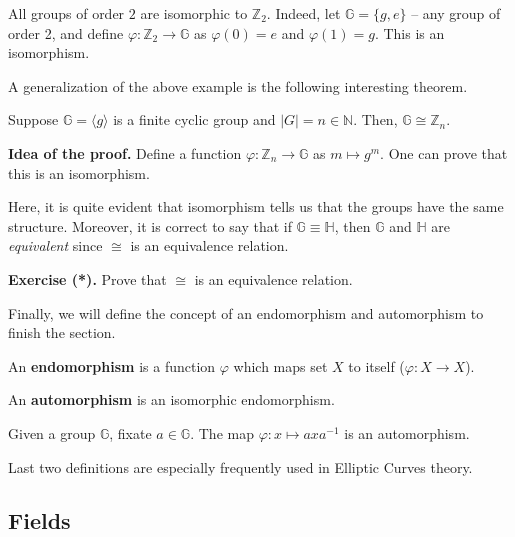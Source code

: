 \documentclass[../lecture-notes-148x210.tex]{subfiles}
\begin{document}
\begin{example}
    All groups of order $2$ are isomorphic to $\mathbb{Z}_2$. Indeed, let $\mathbb{G} = \{g,e\}$ -- any group of order 2, and define $\varphi: \mathbb{Z}_2 \to \mathbb{G}$ as $\varphi(0) = e$ and $\varphi(1) = g$. This is an isomorphism.
\end{example}

A generalization of the above example is the following interesting theorem.

\begin{theorem}
    Suppose $\mathbb{G} = \langle g \rangle$ is a finite cyclic group and $|G| = n \in \mathbb{N}$. Then, $\mathbb{G} \cong \mathbb{Z}_n$.
\end{theorem}

\textbf{Idea of the proof.} Define a function $\varphi: \mathbb{Z}_n \to \mathbb{G}$ as $m \mapsto g^m$. One can prove that this is an isomorphism.

Here, it is quite evident that isomorphism tells us that the groups have the same structure. Moreover, it is correct to say that if $\mathbb{G} \equiv \mathbb{H}$, then $\mathbb{G}$ and $\mathbb{H}$ are \textit{equivalent} since $\cong$ is an equivalence relation.

\textbf{Exercise (*).} Prove that $\cong$ is an equivalence relation.

Finally, we will define the concept of an endomorphism and automorphism to finish the section.

\begin{definition}
    An \textbf{endomorphism} is a function $\varphi$ which maps set $X$ to itself ($\varphi: X \to X$).
\end{definition}

\begin{definition}
    An \textbf{automorphism} is an isomorphic endomorphism.
\end{definition}

\begin{example}
    Given a group $\mathbb{G}$, fixate $a \in \mathbb{G}$. The map $\varphi: x \mapsto axa^{-1}$ is an automorphism.
\end{example}

Last two definitions are especially frequently used in Elliptic Curves theory.

\subsection{Fields}
\end{document}
